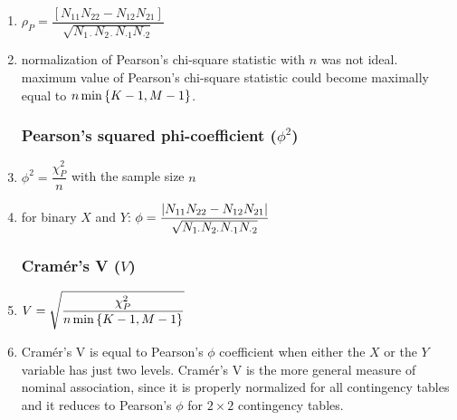 \begin{enumerate}
    \item $\rho_P = \dfrac{[N_{11} N_{22} - N_{12} N_{21}]}{\sqrt{N_{1\cdot } N_{2\cdot } N_{\cdot 1} N_{\cdot 2}}}$
    \hfill \cite{statistics/book/Statistics-for-Data-Scientists/Maurits-Kaptein}

    \item normalization of Pearson’s chi-square statistic with $n$ was not ideal.
    maximum value of Pearson’s chi-square statistic could become maximally equal to $n \min\left\{K - 1, M - 1\right\}$.
    \hfill \cite{statistics/book/Statistics-for-Data-Scientists/Maurits-Kaptein}


\subsubsection{Pearson’s squared phi-coefficient ($\phi^2$)}

    \item $\phi^2 = \dfrac{\chi_P^2}{n}$ with the sample size $n$
    \hfill \cite{statistics/book/Statistics-for-Data-Scientists/Maurits-Kaptein}

    \item for binary $X$ and $Y $:
    $
        \phi = \dfrac{\left| N_{11} N_{22} - N_{12} N_{21} \right|}{\sqrt{N_{1\cdot } N_{2\cdot } N_{\cdot 1} N_{\cdot 2}}}
    $
    \hfill \cite{statistics/book/Statistics-for-Data-Scientists/Maurits-Kaptein}


\subsubsection{Cramér’s V ($V$)}

    \item $V = \sqrt{\dfrac{\chi^2_P}{n \min\left\{K - 1, M - 1\right\}}}$
    \hfill \cite{statistics/book/Statistics-for-Data-Scientists/Maurits-Kaptein}

    \item Cramér’s V is equal to Pearson’s $\phi$ coefficient when either the $X$ or the $Y$ variable has just two levels.
    Cramér’s V is the more general measure of nominal association, since it is properly normalized for all contingency tables and it reduces to Pearson’s $\phi$ for $2 \times 2$ contingency tables.
    \hfill \cite{statistics/book/Statistics-for-Data-Scientists/Maurits-Kaptein}
\end{enumerate}











